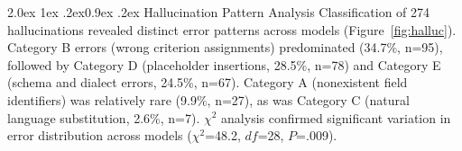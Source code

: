 \documentclass[10pt]{article}
\makeatletter
\renewcommand\subsection{\@startsection{subsection}{2}{\z@}%
  {2.0ex \@plus 1ex \@minus .2ex}{0.9ex \@plus .2ex}%
  {\normalfont\normalsize\bfseries}}
\makeatother
\begin{document}
\subsection{Hallucination Pattern Analysis}
Classification of 274 hallucinations revealed distinct error patterns across
models (Figure~\ref{fig:halluc}). Category B errors (wrong criterion
assignments) predominated (34.7\%, n=95), followed by Category D (placeholder insertions, 28.5\%, n=78) and Category E (schema and dialect errors, 24.5\%, n=67). Category A (nonexistent field identifiers) was relatively rare (9.9\%, n=27), as was Category C (natural language substitution, 2.6\%, n=7). $\chi^2$
analysis confirmed significant variation in error distribution across models
($\chi^2$=48.2, $df$=28, $P$=.009).

\end{document}
